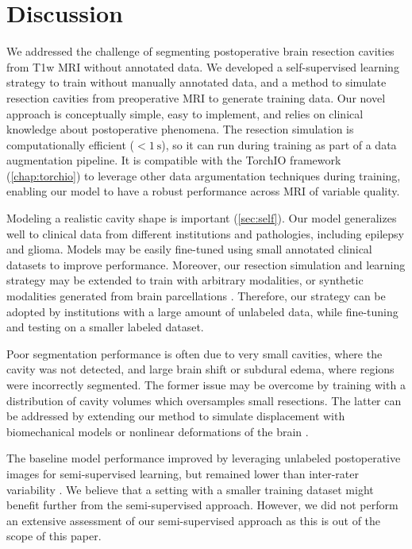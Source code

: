 \section{Discussion}
\label{sec:resections_discussion}

We addressed the challenge of segmenting postoperative brain resection cavities from \ac{T1w} \ac{MRI} without annotated data.
We developed a self-supervised learning strategy to train without manually annotated data, and a method to simulate resection cavities from preoperative \ac{MRI} to generate training data.
Our novel approach is conceptually simple, easy to implement, and relies on clinical knowledge about postoperative phenomena.
The resection simulation is computationally efficient ($< \SI{1}{\second}$), so it can run during training as part of a data augmentation pipeline.
It is compatible with the TorchIO framework \cite{perez-garcia_torchio_2021} (\cref{chap:torchio}) to leverage other data argumentation techniques during training, enabling our model to have a robust performance across \ac{MRI} of variable quality.

Modeling a realistic cavity shape is important (\cref{sec:self}).
Our model generalizes well to clinical data from different institutions and pathologies, including epilepsy and glioma.
Models may be easily fine-tuned using small annotated clinical datasets to improve performance.
Moreover, our resection simulation and learning strategy may be extended to train with arbitrary modalities, or synthetic modalities generated from brain parcellations \cite{billot_learning_2020}.
Therefore, our strategy can be adopted by institutions with a large amount of unlabeled data, while fine-tuning and testing on a smaller labeled dataset.

Poor segmentation performance is often due to very small cavities, where the cavity was not detected, and large brain shift or subdural edema, where regions were incorrectly segmented.
The former issue may be overcome by training with a distribution of cavity volumes which oversamples small resections.
The latter can be addressed by extending our method to simulate displacement with biomechanical models or nonlinear deformations of the brain \cite{granados_generative_2021}.

The baseline model performance improved by leveraging unlabeled postoperative images for semi-supervised learning, but remained lower than inter-rater variability \cite{perez-garcia_simulation_2020}.  %
We believe that a setting with a smaller training dataset might benefit further from the semi-supervised approach.
However, we did not perform an extensive assessment of our semi-supervised approach as this is out of the scope of this paper.

